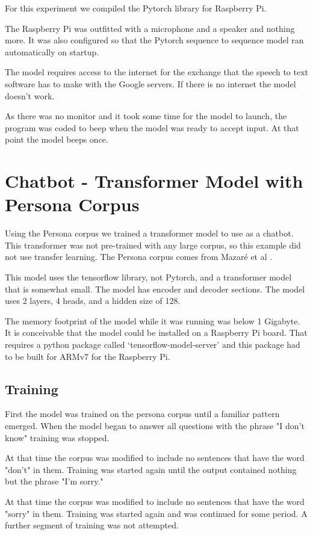 For this experiment we compiled the Pytorch library for Raspberry Pi.

The Raspberry Pi was outfitted with a microphone and a speaker and nothing more. It was also configured so that the Pytorch sequence to sequence model ran automatically on startup.

The model requires access to the internet for the exchange that the speech to text software has to make with the Google servers. If there is no internet the model doesn't work.

As there was no monitor and it took some time for the model to launch, the program was coded to beep when the model was ready to accept input. At that point the model beeps once.

\section{Chatbot - Transformer Model with Persona Corpus}
Using the Persona corpus we trained a transformer model to use as a chatbot. This transformer was not pre-trained with any large corpus, so this example did not use transfer learning. The Persona corpus comes from Mazar{\'{e}} et al \cite{DBLP:journals/corr/abs-1809-01984}.

This model uses the tensorflow library, not Pytorch, and a transformer model that is somewhat small. The model has encoder and decoder sections. The model uses 2 layers, 4 heads, and a hidden size of 128.

The memory footprint of the model while it was running was below 1 Gigabyte. It is conceivable that the model could be installed on a Raspberry Pi board. That requires a python package called `tensorflow-model-server' and this package had to be built for ARMv7 for the Raspberry Pi. 

\subsection{Training}
First the model was trained on the persona corpus until a familiar pattern emerged. When the model began to answer all questions with the phrase "I don't know" training was stopped. 

At that time the corpus was modified to include no sentences that have the word "don't" in them. Training was started again until the output contained nothing but the phrase "I'm sorry." 

At that time the corpus was modified to include no sentences that have the word "sorry" in them. Training was started again and was continued for some period. A further segment of training was not attempted. 

